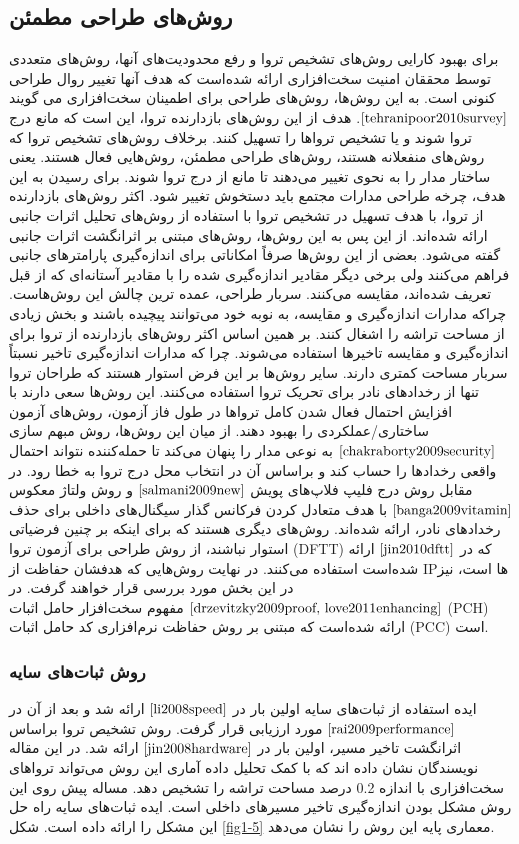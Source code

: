 \subsection{روش‌های طراحی مطمئن}
برای بهبود کارایی روش‌های تشخیص تروا و رفع محدودیت‌های آنها، روش‌های متعددی توسط محققان امنیت سخت‌افزاری ارائه شده‌است که هدف آنها تغییر روال طراحی کنونی است. به این روش‌ها، روش‌های طراحی برای اطمینان سخت‌افزاری می گویند $\cite{tehranipoor2010survey}$. هدف از این روش‌های بازدارنده تروا، این است که مانع درج تروا شوند و یا تشخیص تروا‌ها را تسهیل کنند. برخلاف روش‌های تشخیص تروا که روش‌های منفعلانه هستند، روش‌های طراحی مطمئن، روش‌هایی فعال هستند. یعنی ساختار مدار را به نحوی تغییر می‌دهند تا مانع از درج تروا شوند. برای رسیدن به این هدف، چرخه طراحی مدارات مجتمع باید دستخوش تغییر شود.
اکثر روش‌های بازدارنده از تروا، با هدف تسهیل در تشخیص تروا با استفاده از روش‌های تحلیل اثرات جانبی ارائه شده‌اند. از این پس به این روش‌ها، روش‌های مبتنی بر اثرانگشت اثرات جانبی گفته می‌شود. بعضی از این روش‌ها صرفاً امکاناتی برای اندازه‌گیری پارامترهای جانبی فراهم می‌کنند ولی برخی دیگر مقادیر اندازه‌گیری شده را با مقادیر آستانه‌ای که از قبل تعریف شده‌اند، مقایسه می‌کنند. سربار طراحی، عمده ترین چالش این روش‌هاست. چراکه مدارات اندازه‌گیری و مقایسه، به نوبه خود می‌توانند پیچیده باشند و بخش زیادی از مساحت تراشه را اشغال کنند. بر همین اساس اکثر روش‌های بازدارنده از تروا برای اندازه‌گیری و مقایسه تاخیرها استفاده می‌شوند. چرا که مدارات اندازه‌گیری تاخیر نسبتاً سربار مساحت کمتری دارند.
سایر روش‌ها بر این فرض استوار هستند که طراحان تروا تنها از رخدادهای نادر برای تحریک تروا استفاده می‌کنند. این روش‌ها سعی دارند با افزایش احتمال فعال شدن کامل تروا‌ها در طول فاز آزمون، روش‌های آزمون ساختاری/عملکردی را بهبود دهند. از میان این روش‌ها، روش مبهم سازی $\cite{chakraborty2009security}$ به نوعی مدار را پنهان می‌کند تا حمله‌کننده نتواند احتمال واقعی رخدادها را حساب کند و براساس آن در انتخاب محل درج تروا به خطا رود. در مقابل روش درج فلیپ فلاپ‌های پویش $\cite{salmani2009new}$ و روش ولتاژ معکوس $\cite{banga2009vitamin}$ با هدف متعادل کردن فرکانس گذار سیگنال‌های داخلی برای حذف رخدادهای نادر، ارائه شده‌اند. روش‌های دیگری هستند که برای اینکه بر چنین فرضیاتی استوار نباشند، از روش طراحی برای آزمون تروا (DFTT) که در $\cite{jin2010dftt}$ ارائه شده‌است استفاده می‌کنند.
در نهایت روش‌هایی که هدفشان حفاظت از IP‌ها‌‌ است، نیز در این بخش مورد بررسی قرار خواهند گرفت. در 
$\cite{drzevitzky2009proof, love2011enhancing}$
مفهوم سخت‌افزار حامل اثبات (PCH) ارائه شده‌است که مبتنی بر روش حفاظت نرم‌افزاری کد حامل اثبات (PCC) است.
\subsubsection {روش ثبات‌های سایه}
ایده استفاده از ثبات‌های سایه اولین بار در $\cite{li2008speed}$ ارائه شد و بعد از آن در $\cite{rai2009performance}$ مورد ارزیابی قرار گرفت. روش تشخیص تروا براساس اثرانگشت تاخیر مسیر، اولین بار در $\cite{jin2008hardware}$ ارائه شد. در این مقاله نویسندگان نشان داده اند که با کمک تحلیل داده آماری این روش می‌تواند تروا‌های سخت‌افزاری با اندازه 0.2 درصد مساحت تراشه را تشخیص دهد. مساله پیش روی این روش مشکل بودن اندازه‌گیری تاخیر مسیرهای داخلی است. ایده ثبات‌های سایه راه حل این مشکل را ارائه داده است. شکل \ref{fig1-5} معماری پایه این روش را نشان می‌دهد.

